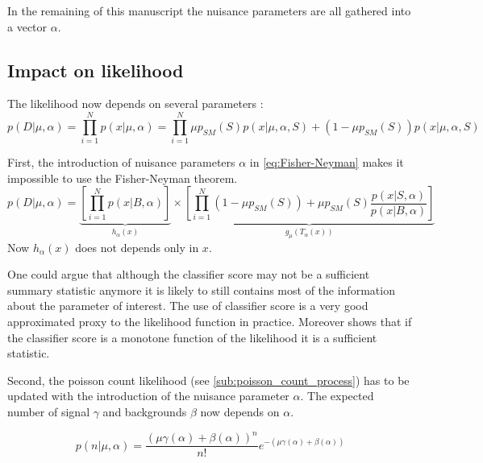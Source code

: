 
In the remaining of this manuscript the nuisance parameters are all gathered into a vector $\alpha$.




\subsection{Impact on likelihood} %
\label{sub:impact_on_likelihood}


The likelihood now depends on several parameters :
\begin{equation}
	p(D | \mu, \alpha) = \prod_{i=1}^N p(x | \mu, \alpha) 
		= \prod_{i=1}^N \mu p_{SM}(S) p(x | \mu, \alpha, S) + (1-\mu p_{SM}(S)) p(x | \mu, \alpha, S)
\end{equation}

First, the introduction of nuisance parameters $\alpha$ in \autoref{eq:Fisher-Neyman} makes it impossible to use the Fisher-Neyman theorem.
\begin{equation}
	p(D|\mu, \alpha) = \underbrace{\left[ \prod_{i=1}^N p(x|B, \alpha) \right ]}_{h_\alpha(x)} \times 
       \underbrace{\left [\prod_{i=1}^N (1-\mu p_{SM}(S)) + \mu p_{SM}(S) \frac{p(x|S, \alpha)}{p(x|B, \alpha)} \right ]}_{g_\mu(T_\alpha(x))}
\end{equation}
Now $h_\alpha(x)$ does not depends only in $x$.

One could argue that although the classifier score may not be a sufficient summary statistic anymore it is likely to still contains most of the information about the parameter of interest.
The use of classifier score is a very good approximated proxy to the likelihood function in practice.
Moreover \cite{Cranmer2015} shows that if the classifier score is a monotone function of the likelihood it is a sufficient statistic.


Second, the poisson count likelihood (see \autoref{sub:poisson_count_process}) has to be updated with the introduction of the nuisance parameter $\alpha$.
The expected number of signal $\gamma$ and backgrounds $\beta$ now depends on $\alpha$.

\begin{equation}
	p(n| \mu, \alpha) = \frac{(\mu \gamma(\alpha) +\beta(\alpha))^n }{n!} e^{-(\mu \gamma(\alpha) +\beta(\alpha))}
\end{equation}

